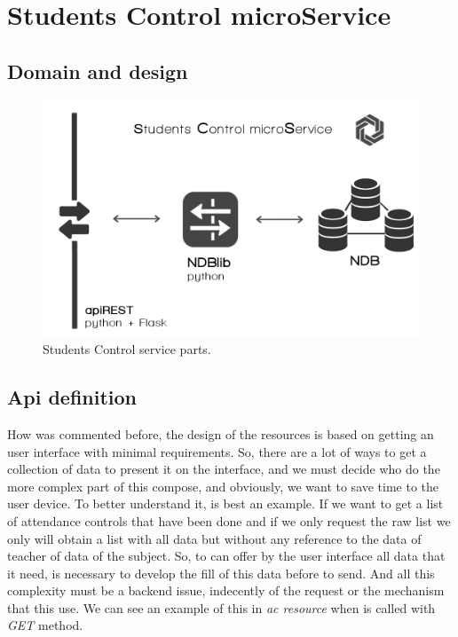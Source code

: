 \section{Students Control microService}

\subsection{Domain and design}

\begin{figure}[H]
  \includegraphics[scale=0.4]{img/graphics/scms.png}
  \centering
  \caption{Students Control service parts.}
\end{figure}

\subsection{Api definition}

How was commented before, the design of the resources is based on getting an user
interface with minimal requirements. So, there are a lot of ways to get a collection
of data to present it on the interface, and we must decide who do the more complex
part of this compose, and obviously, we want to save time to the user device.
To better understand it, is best an example. If we want to get a list of attendance
controls that have been done and if we only request the raw list we only will
obtain a list with all data but without any reference to the data of teacher of
data of the subject.
\intro
So, to can offer by the user interface all data that it need,   is necessary to
develop the fill of this data before to send. And all this complexity must be a
backend issue, indecently of the request or the mechanism that this use.
We can see an example of this in \textit{ac resource} when is called with
\textit{GET} method.



